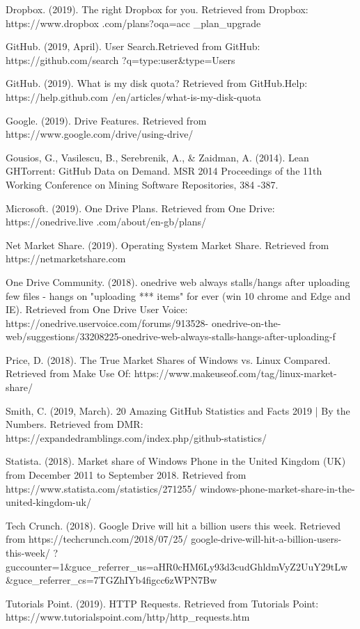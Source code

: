 \documentclass[11pt]{article}
\begin{document}
Dropbox. (2019). The right Dropbox
for you. Retrieved
from Dropbox: https://www.dropbox
.com/plans?oqa=acc
\_plan\_upgrade


GitHub. (2019, April). User Search.Retrieved from GitHub: https://github.com/search ?q=type:user\&type=Users


GitHub. (2019). What is my disk quota?
Retrieved from 
GitHub.Help: https://help.github.com
/en/articles/what-is-my-disk-quota


Google. (2019). Drive Features. Retrieved from 
https://www.google.com/drive/using-drive/


Gousios, G., Vasilescu, 
B., Serebrenik, A., \& Zaidman, 
A. (2014). Lean GHTorrent:
GitHub Data on Demand. MSR 2014 Proceedings of the
11th Working Conference on
Mining Software Repositories, 384 -387.


Microsoft. (2019). One Drive Plans.
Retrieved from One
Drive: https://onedrive.live
.com/about/en-gb/plans/


Net Market Share. (2019). Operating 
System Market Share.
Retrieved from https://netmarketshare.com


One Drive Community. (2018). onedrive web always stalls/hangs 
after uploading few files - hangs on "uploading *** items" for
ever (win 10 chrome and Edge and IE). Retrieved from One Drive User Voice: https://onedrive.uservoice.com/forums/913528-
onedrive-on-the-web/suggestions/33208225-onedrive-web-always-stalls-hangs-after-uploading-f


Price, D. (2018). The True Market Shares of Windows 
vs. Linux Compared. Retrieved from Make Use Of:
https://www.makeuseof.com/tag/linux-market-share/


Smith, C. (2019, March). 20 Amazing GitHub Statistics 
and Facts 2019 | By the Numbers. Retrieved from DMR:
https://expandedramblings.com/index.php/github-statistics/


Statista. (2018). Market share of Windows Phone 
in the United Kingdom (UK) from December 2011 to September 2018.
Retrieved from https://www.statista.com/statistics/271255/
windows-phone-market-share-in-the-united-kingdom-uk/


Tech Crunch. (2018). Google Drive will hit a billion users this week.
Retrieved from https://techcrunch.com/2018/07/25/
google-drive-will-hit-a-billion-users-this-week/
?guccounter=1\&guce\_referrer\_us=aHR0cHM6Ly93d3cudGhldmVyZ2UuY29tLw
\&guce\_referrer\_cs=7TGZhIYb4figcc6zWPN7Bw


Tutorials Point. (2019). HTTP Requests. Retrieved from 
Tutorials Point: https://www.tutorialspoint.com/http/http\_requests.htm
\end{document}
